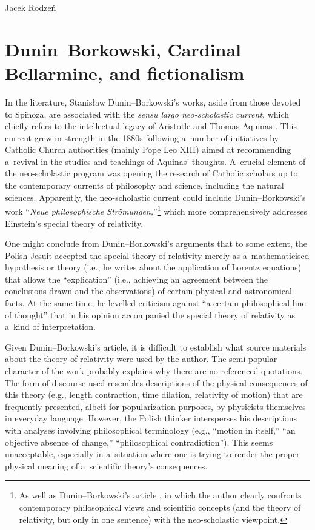 \begin{artengenv}{Jacek Rodzeń}
\section{Dunin–Borkowski, Cardinal Bellarmine, and fictionalism}
In the literature, Stanisław Dunin–Borkowski's works, aside from those devoted to Spinoza, are associated with the \textit{sensu largo neo-scholastic current}, which chiefly refers to the intellectual legacy of Aristotle and Thomas Aquinas
\parencites[][p.305]{bruehl_implications_1921}[][pp.119–123]{benk_moderne_2000}. %
 This current grew in strength in the 1880s following a~number of initiatives by Catholic Church authorities (mainly Pope Leo XIII) aimed at recommending a~revival in the studies and teachings of Aquinas' thoughts. A~crucial element of the neo-scholastic program was opening the research of Catholic scholars up to the contemporary currents of philosophy and science, including the natural sciences. Apparently, the neo-scholastic current could include Dunin–Borkowski's work ``\textit{Neue philosophische Strömungen,}''\footnote{As well as Dunin–Borkowski's article 
\parencite*[][]{dunin-borkowski_auf_1921}, %
 in which the author clearly confronts contemporary philosophical views and scientific concepts (and the theory of relativity, but only in one sentence) with the neo-scholastic viewpoint.} which more comprehensively addresses Einstein's special theory of relativity.

One might conclude from Dunin–Borkowski's arguments that to some extent, the Polish Jesuit accepted the special theory of relativity merely as a~mathematicised hypothesis or theory (i.e., he writes about the application of Lorentz equations) that allows the ``explication'' (i.e., achieving an agreement between the conclusions drawn and the observations) of certain physical and astronomical facts. At the same time, he levelled criticism against ``a certain philosophical line of thought'' that in his opinion accompanied the special theory of relativity as a~kind of interpretation.

Given Dunin–Borkowski's article, it is difficult to establish what source materials about the theory of relativity were used by the author. The semi-popular character of the work probably explains why there are no referenced quotations. The form of discourse used resembles descriptions of the physical consequences of this theory (e.g., length contraction, time dilation, relativity of motion) that are frequently presented, albeit for popularization purposes, by physicists themselves in everyday language. However, the Polish thinker intersperses his descriptions with analyses involving philosophical terminology (e.g., ``motion in itself,'' ``an objective absence of change,'' ``philosophical contradiction''). This seems unacceptable, especially in a~situation where one is trying to render the proper physical meaning of a~scientific theory's consequences.


\end{artengenv}
